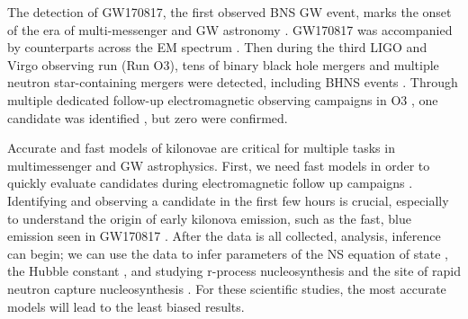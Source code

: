 \documentclass[fleqn,usenatbib,useAMS]{mnras}
\begin{document}
The detection of GW170817, the first observed BNS GW event, marks the onset of the era of multi-messenger and GW astronomy \citep{ligoscientificcollaborationandvirgocollaborationGW170817ObservationGravitational2017}.
GW170817 was accompanied by counterparts across the EM spectrum \citep[e.g.,][]{arcaviOpticalEmissionKilonova2017,coulterSwopeSupernovaSurvey2017,droutLightCurvesNeutron2017,shappeeEarlySpectraGravitational2017,smarttKilonovaElectromagneticCounterpart2017,soares-santosElectromagneticCounterpartBinary2017,valentiDiscoveryElectromagneticCounterpart2017,abbottMultimessengerObservationsBinary2017, goldsteinGROWTHS190426cRealtime2019, savchenkoINTEGRALDetectionFirst2017,abbottGravitationalWavesGammaRays2017}.
Then during the third LIGO and Virgo observing run (Run O3), tens of binary black hole mergers and multiple neutron star-containing mergers were detected, including BHNS events \citep{abbottGWTC2CompactBinary2021,NSBHLIGO,GWTC3}. 
Through multiple dedicated follow-up electromagnetic observing campaigns in O3 \citep{coughlinGROWTHS190425zSearching2019, goldsteinGROWTHS190426cRealtime2019, antierGRANDMAObservationsAdvanced2020,pageSwiftXRTFollowupGravitational2020,gompertzSearchingElectromagneticCounterparts2020,Anand:2020eyg}, 
one candidate was identified  \citep{grahamCandidateElectromagneticCounterpart2020}, but zero were confirmed. 




Accurate and fast models of kilonovae are critical for multiple tasks in multimessenger and GW astrophysics.
First, we need fast models in order to quickly evaluate candidates during electromagnetic follow up campaigns \citep{soares-santosElectromagneticCounterpartBinary2017}. 
Identifying and observing a candidate in the first few hours is crucial, especially to understand the origin of early kilonova emission, such as the fast, blue emission seen in GW170817 \citep{ArcaviFirstHoursGW170817}.
After the data is all collected, analysis, inference can begin; we can use the data to infer parameters of the NS equation of state \citep[e.g.,][]{radiceBinaryNeutronStar2018, coughlinConstraintsNeutronStar2018, RaaijmakersPSRj0740}, the Hubble constant \citep[e.g.,][]{abbottGravitationalwaveStandardSiren2017, coughlinMeasuringHubbleConstant2020, dietrichMultimessengerConstraintsNeutronstar2020}, and studying r-process nucleosynthesis \citep[e.g.,][]{droutLightCurvesNeutron2017} and the site of rapid neutron capture nucleosynthesis \citep[e.g.,][]{kasenOriginHeavyElements2017}. 
For these scientific studies, the most accurate models will lead to the least biased results. 
\end{document}
